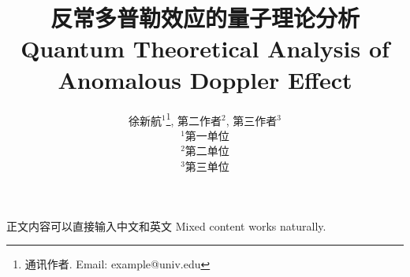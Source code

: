 \documentclass{cpbtex}
\begin{document}
\title{反常多普勒效应的量子理论分析\\
Quantum Theoretical Analysis of Anomalous Doppler Effect}

\author{
徐新航$^{1}$\thanks{通讯作者. Email: example@univ.edu}, 
第二作者$^{2}$, 
第三作者$^{3}$\\
$^{1}$第一单位\\
$^{2}$第二单位\\ 
$^{3}$第三单位
}

\maketitle

正文内容可以直接输入中文和英文 Mixed content works naturally.
\end{document}
